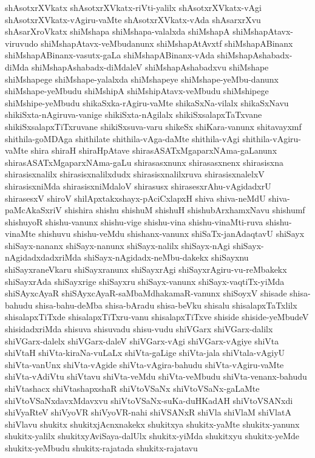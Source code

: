 {shAsotxrXVkatx
shAsotxrXVkatx-riVti-yalilx
shAsotxrXVkatx-vAgi
shAsotxrXVkatx-vAgiru-vaMte
shAsotxrXVkatx-vAda
shAsarxrXvu
shAsarXroVkatx
shiMshapa
shiMshapa-valalxda
shiMshapA
shiMshapAtavx-viruvudo
shiMshapAtavx-veMbudanunx
shiMshapAtAvxtf
shiMshapABinanx
shiMshapABinanx-vasutx-gaLa
shiMshapABinanx-vAda
shiMshapAshabadx-diMda
shiMshapAshabadx-diMdaleV
shiMshapAshabadxvu
shiMshape
shiMshapege
shiMshape-yalalxda
shiMshapeye
shiMshape-yeMbu-danunx
shiMshape-yeMbudu
shiMshipA
shiMshipAtavx-veMbudu
shiMshipege
shiMshipe-yeMbudu
shikaSxka-rAgiru-vaMte
shikaSxNa-vilalx
shikaSxNavu
shikiSxta-nAgiruva-vanige
shikiSxta-nAgilalx
shikiSxsalapxTaTxvane
shikiSxsalapxTiTxruvane
shikiSxsuva-varu
shikeSx
shiKara-vanunx
shitavayxmf
shithila-goMDAga
shithilate
shithila-vAga-daMte
shithila-vAgi
shithila-vAgiru-vaMte
shira
shiraH
shiraHpAtave
shirasASATxMgaparxNAma-gaLanunx
shirasASATxMgaparxNAma-gaLu
shirasasxnunx
shirasasxnenx
shirasisxna
shirasisxnalilx
shirasisxnalilxdudx
shirasisxnalilxruva
shirasisxnalelxV
shirasisxniMda
shirasisxniMdaloV
shirasusx
shirasesxrAhu-vAgidadxrU
shirasesxV
shiroV
shilApxtakxshayx-pAciCxlapxH
shiva
shiva-neMdU
shiva-paMcAkaSxriV
shishira
shishu
shishuM
shishuH
shishubArxhamxNavu
shishumf
shishuyoR
shishu-vanunx
shishu-vige
shishu-vina
shishu-vinaMti-ruva
shishu-vinaMte
shishuvu
shishu-veMdu
shishanx-vanunx
shiSaTx-janAdaqtavU
shiSayx
shiSayx-nananx
shiSayx-nanunx
shiSayx-nalilx
shiSayx-nAgi
shiSayx-nAgidadxdadxriMda
shiSayx-nAgidadx-neMbu-dakekx
shiSayxnu
shiSayxraneVkaru
shiSayxranunx
shiSayxrAgi
shiSayxrAgiru-vu-reMbakekx
shiSayxrAda
shiSayxrige
shiSayxru
shiSayx-vanunx
shiSayx-vaqtiTx-yiMda
shiSAyxcAyaR
shiSAyxcAyaR-saMbaMdhakamaR-vanunx
shiSoyxV
shisade
shisa-bahudu
shisa-bahu-deMba
shisa-bAradu
shisa-beVku
shisalu
shisalapxTaTxlilx
shisalapxTiTxde
shisalapxTiTxru-vanu
shisalapxTiTxve
shiside
shiside-yeMbudeV
shisidadxriMda
shisuva
shisuvadu
shisu-vudu
shiVGarx
shiVGarx-dalilx
shiVGarx-dalelx
shiVGarx-daleV
shiVGarx-vAgi
shiVGarx-vAgiye
shiVta
shiVtaH
shiVta-kiraNa-vuLaLx
shiVta-gaLige
shiVta-jala
shiVtala-vAgiyU
shiVta-vanUnx
shiVta-vAgide
shiVta-vAgira-bahudu
shiVta-vAgiru-vaMte
shiVta-vAdiVtu
shiVtavu
shiVta-veMdu
shiVta-veMbudu
shiVta-venanx-bahudu
shiVtashacx
shiVtashapxshaR
shiVtoVSaNx
shiVtoVSaNx-gaLaMte
shiVtoVSaNxdavxMdavxvu
shiVtoVSaNx-suKa-duHKadAH
shiVtoVSANxdi
shiVyaRteV
shiVyoVR
shiVyoVR-nahi
shiVSANxR
shiVla
shiVlaM
shiVlatA
shiVlavu
shukitx
shukitxjAcnxnakekx
shukitxya
shukitx-yaMte
shukitx-yanunx
shukitx-yalilx
shukitxyAviSaya-dalUlx
shukitx-yiMda
shukitxyu
shukitx-yeMde
shukitx-yeMbudu
shukitx-rajatada
shukitx-rajatavu
}
